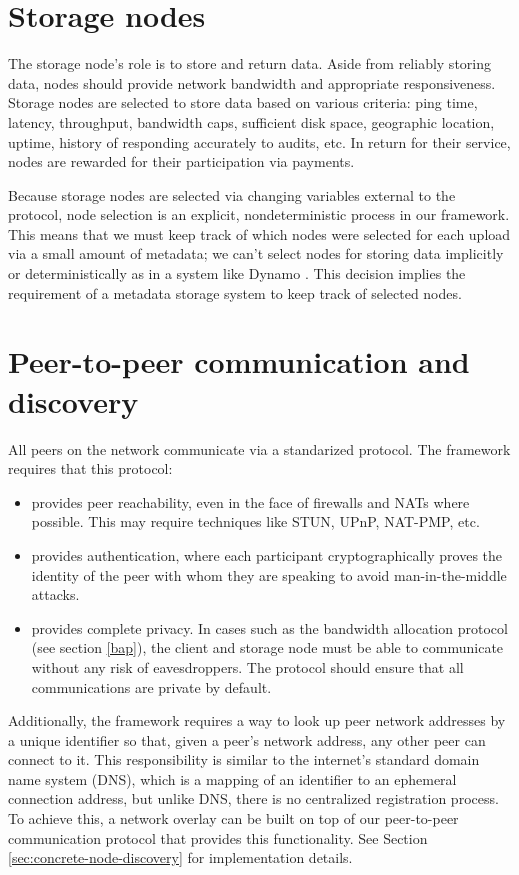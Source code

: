 \documentclass[11pt,fleqn,openany]{book}
\begin{document}
\section{Storage nodes}

The storage node's role is to store and return data.
Aside from reliably storing data, nodes should provide
network bandwidth and appropriate responsiveness.
Storage nodes are selected to store data based on various criteria: ping time,
latency, throughput, bandwidth caps, sufficient disk space,
geographic location, uptime, history of responding accurately to audits, etc.
In return for their service, nodes are rewarded for their participation via
payments.

Because storage
nodes are selected via changing variables external to the protocol, node
selection is an explicit, nondeterministic process in our framework. This means
that we must keep track of which nodes were selected for each upload via a
small amount of metadata; we can't select nodes for storing data implicitly or
deterministically as in a system like Dynamo \cite{dynamo}. This decision
implies the requirement of a metadata storage system to keep track
of selected nodes.

\section{Peer-to-peer communication and discovery}

All peers on the network communicate via a standarized protocol. The
framework requires that this protocol:

\begin{itemize}
\item provides peer reachability, even in the face of firewalls
and NATs where possible.
This may require techniques like STUN, UPnP, NAT-PMP, etc.
\item provides authentication, where each participant cryptographically
proves the identity of the peer with whom they are speaking to avoid
man-in-the-middle attacks.
\item provides complete privacy. In cases such as the bandwidth allocation
protocol (see section \ref{bap}), the client and storage node must be able
to communicate without any risk of eavesdroppers. The protocol should
ensure that all communications are private by default.
\end{itemize}

Additionally, the framework requires a way to look up peer network addresses
by a unique identifier so that, given a peer's network address, any other
peer can connect to it. This responsibility is similar to the internet's
standard domain name system (DNS), which is a mapping of an identifier to an
ephemeral connection address, but unlike DNS, there is no centralized
registration process.
To achieve this, a network overlay can be
built on top of our peer-to-peer communication protocol that provides this
functionality. See Section \ref{sec:concrete-node-discovery} for
implementation details.
\end{document}
